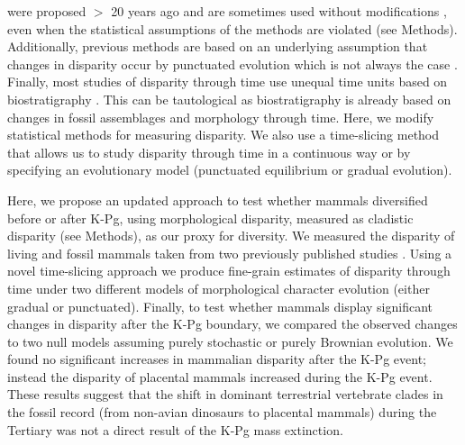 \documentclass[12pt,letterpaper]{article}
\begin{document}
\begin{enumerate}
    were proposed $>$ 20 years ago \citep{Foote01071994,Wills1994} and are sometimes used without modifications \citep[e.g.,][]{brusatte50,Brusatte12092008,cisneros2010,thorneresetting2011,prentice2011,brusattedinosaur2012,toljagictriassic-jurassic2013,ruta2013,bentonmodels2014,bensonfaunal2014}, even when the statistical assumptions of the methods are violated (see Methods).
    Additionally, previous methods are based on an underlying assumption that changes in disparity occur by punctuated evolution \citep[e.g.][]{Wesley-Hunt2005} which is not always the case \citep{Hunt21042015}.
    Finally, most studies of disparity through time use unequal time units based on biostratigraphy \citep{Brusatte12092008,brusattedinosaur2012,toljagictriassic-jurassic2013}. 
    This can be tautological as biostratigraphy is already based on changes in fossil assemblages and morphology through time.
    Here, we modify statistical methods for measuring disparity.
    We also use a time-slicing method that allows us to study disparity through time in a continuous way or by specifying an evolutionary model (punctuated equilibrium or gradual evolution).
  \end{enumerate}

Here, we propose an updated approach to test whether mammals diversified before or after K-Pg, using morphological disparity, measured as cladistic disparity (see Methods), as our proxy for diversity.
We measured the disparity of living and fossil mammals taken from two previously published studies \citep{Slater2012MEE,beckancient2014}. %
Using a novel time-slicing approach we produce fine-grain estimates of disparity through time under two different models of morphological character evolution (either gradual or punctuated). 
Finally, to test whether mammals display significant changes in disparity after the K-Pg boundary, we compared the observed changes to two null models assuming purely stochastic or purely Brownian evolution. 
We found no significant increases in mammalian disparity after the K-Pg event; instead the disparity of placental mammals increased during the K-Pg event. 
These results suggest that the shift in dominant terrestrial vertebrate clades in the fossil record (from non-avian dinosaurs to placental mammals) during the Tertiary was not a direct result of the K-Pg mass extinction.
\end{document}
